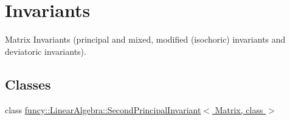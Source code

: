 \hypertarget{group__InvariantGroup}{\section{Invariants}
\label{group__InvariantGroup}
}


Matrix Invariants (principal and mixed, modified (isochoric) invariants and deviatoric invariants).  


\subsection*{Classes}
\begin{DoxyCompactItemize}
\item 
class \hyperlink{classfuncy_1_1LinearAlgebra_1_1SecondPrincipalInvariant}{funcy\-::\-Linear\-Algebra\-::\-Second\-Principal\-Invariant$<$ Matrix, class $>$}
\end{DoxyCompactItemize}
